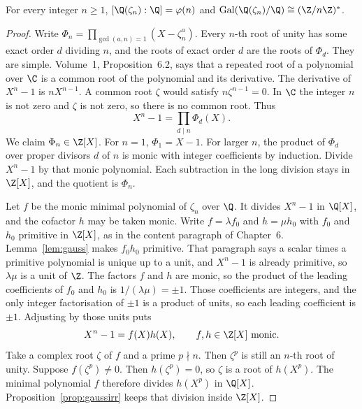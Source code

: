 \begin{proposition}\label{prop:cyclodegree}
For every integer $n\ge1$, $[\Q(\zeta_n):\Q]=\varphi(n)$ and $\operatorname{Gal}(\Q(\zeta_n)/\Q)\cong(\Z/n\Z)^*$.
\end{proposition}
\begin{proof}
Write $\Phi_n=\prod_{\gcd(a,n)=1}(X-\zeta_n^a)$. Every $n$-th root of unity has some exact order $d$ dividing $n$, and the roots of exact order $d$ are the roots of $\Phi_d$. They are simple. Volume~1, Proposition~6.2, says that a repeated root of a polynomial over $\C$ is a common root of the polynomial and its derivative. The derivative of $X^n-1$ is $nX^{n-1}$. A common root $\zeta$ would satisfy $n\zeta^{n-1}=0$. In $\C$ the integer $n$ is not zero and $\zeta$ is not zero, so there is no common root. Thus
\[
X^n-1=\prod_{d\mid n}\Phi_d(X).
\]
We claim $\Phi_n\in\Z[X]$. For $n=1$, $\Phi_1=X-1$. For larger $n$, the product of $\Phi_d$ over proper divisors $d$ of $n$ is monic with integer coefficients by induction. Divide $X^n-1$ by that monic polynomial. Each subtraction in the long division stays in $\Z[X]$, and the quotient is $\Phi_n$.

Let $f$ be the monic minimal polynomial of $\zeta_n$ over $\Q$. It divides $X^n-1$ in $\Q[X]$, and the cofactor $h$ may be taken monic. Write $f=\lambda f_0$ and $h=\mu h_0$ with $f_0$ and $h_0$ primitive in $\Z[X]$, as in the content paragraph of Chapter~6. Lemma~\ref{lem:gauss} makes $f_0h_0$ primitive. That paragraph says a scalar times a primitive polynomial is unique up to a unit, and $X^n-1$ is already primitive, so $\lambda\mu$ is a unit of $\Z$. The factors $f$ and $h$ are monic, so the product of the leading coefficients of $f_0$ and $h_0$ is $1/(\lambda\mu)=\pm1$. Those coefficients are integers, and the only integer factorisation of $\pm1$ is a product of units, so each leading coefficient is $\pm1$. Adjusting by those units puts
\[
X^n-1=f(X)h(X),\qquad f,h\in\Z[X]\text{ monic}.
\]
Take a complex root $\zeta$ of $f$ and a prime $p\nmid n$. Then $\zeta^p$ is still an $n$-th root of unity. Suppose $f(\zeta^p)\ne0$. Then $h(\zeta^p)=0$, so $\zeta$ is a root of $h(X^p)$. The minimal polynomial $f$ therefore divides $h(X^p)$ in $\Q[X]$. Proposition~\ref{prop:gaussirr} keeps that division inside $\Z[X]$.


\end{proof}
